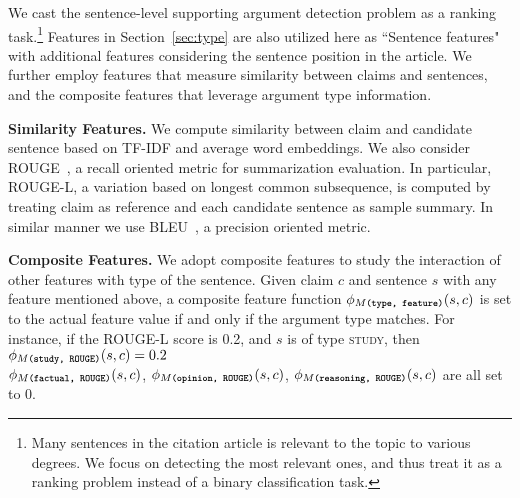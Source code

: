 
We cast the sentence-level supporting argument detection problem as a ranking task.\footnote{Many sentences in the citation article is relevant to the topic to various degrees. We focus on detecting the most relevant ones, and thus treat it as a ranking problem instead of a binary classification task.}  
%
Features in Section~\ref{sec:type} are also utilized here as ``Sentence features" with additional features considering the sentence position in the article. We further employ features that measure similarity between claims and sentences, and the composite features that leverage argument type information. 

\vspace{1mm}
\noindent \textbf{Similarity Features.} We compute similarity between claim and candidate sentence based on TF-IDF and average word embeddings. We also consider ROUGE~\cite{lin2004rouge}, a recall oriented metric for summarization evaluation. In particular, ROUGE-L, a variation based on longest common subsequence, is computed by treating claim as reference and each candidate sentence as sample summary. In similar manner we use BLEU~\cite{papineni2002bleu}, a precision oriented metric.

\vspace{1mm}
\noindent \textbf{Composite Features.} We adopt composite features to study the interaction of other features with type of the sentence. Given claim $c$ and sentence $s$ with any feature mentioned above, a composite feature function $\phi_{M\texttt{\textbf{\scriptsize (type, feature)}}}(s,c)$ is set to the actual feature value if and only if the argument type matches. For instance, if the ROUGE-L score is 0.2, and $s$ is of type \textsc{study}, then {\small $\phi_{M\texttt{\textbf{\scriptsize (study, ROUGE)}}}(s,c)=0.2$ }\\
{\small $\phi_{M\texttt{\textbf{\scriptsize (factual, ROUGE)}}}{\small(s,c)}$, $\phi_{M\texttt{\textbf{\scriptsize (opinion, ROUGE)}}}{\small(s,c)}$, $\phi_{M\texttt{\textbf{\scriptsize (reasoning, ROUGE)}}}(s,c)$} are all set to 0.

